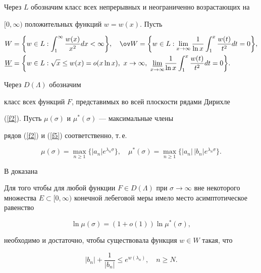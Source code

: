 Через $L$ обозначим класс всех непрерывных и неограниченно возрастающих на


$[0,\infty)$ положительных функций $w=w(x)$. Пусть


\begin{align*}


W&=\bigg\{w\in L:\int_{1}^{\infty}\frac{w(x)}{x^{2}}dx<\infty\bigg\},\quad


\ov W=\bigg\{w\in L:\lim_{x\to\infty}\frac{1}{\ln x}


\int^x_1\frac{w(t)}{t^2}d t=0\bigg\}, \\


%


\underline{W}&=\bigg\{w\in L:\sqrt{x}\leq w(x)=o(x\ln x),\ x\to\infty,\


\underset{x\to\infty}{\varliminf}{}


\frac{1}{\ln x}\int_{1}^{x}\frac{w(t)}{t^{2}}dt=0\bigg\}.


\end{align*}





Через $D(\Lambda)$ обозначим


класс всех функций $F$, представимых во всей плоскости рядами Дирихле


(\ref{f2}). Пусть $\mu(\sigma)$ и $\mu^{*}(\sigma)$ --- максимальные члены


рядов (\ref{f2}) и (\ref{f5}) соответственно, т.\,е.


$$


\mu(\sigma)=\max_{n\geq 1}\{{|a_{n}|e^{\lambda_{n}\sigma}}\},\quad


\mu^{*}(\sigma)=\max_{n\geq 1}\{{|a_{n}|\,|b_{n}|e^{\lambda_{n}\sigma}}\}.


$$





В \cite{lit2} доказана 





\begin{thmnonum}


Для того чтобы  для любой функции $F\in


D(\Lambda)$ при $\sigma\to\infty$ вне некоторого множества $E\subset


[0,\infty)$ конечной лебеговой меры имело место асимптотическое равенство


$$


\ln\mu(\sigma)=(1+o(1))\ln\mu^{*}(\sigma),


$$


необходимо и достаточно, чтобы существовала функция $w\in W$ такая, что


\begin{equation}\label{f8}


|b_{n}|+\frac{1}{|b_{n}|}\leq e^{w(\lambda_{n})},\quad n\geq N.


\end{equation}


\end{thmnonum}





